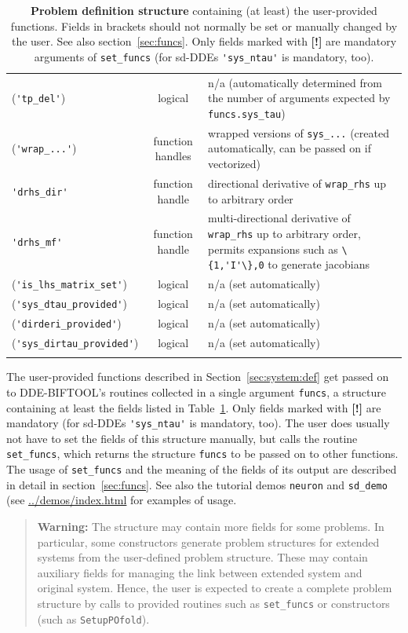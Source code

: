 \documentclass[10pt]{scrartcl}
\newcommand{\DDEBIFCODE}{\textsc{DDE-BIFTOOL}}
\newcommand{\demobase}{\url{../demos/index.html}}
\newcommand{\blist}[1]{\mbox{\lstinline!#1!}}
\begin{document}
\begin{table}[htbp]
\begin{tabular}[t]{l@{\hspace*{1ex}}c@{\hspace*{3ex}}p{}}
      (\blist{'tp_del'}) & logical & n/a (automatically
      determined from the number of arguments expected by \blist{funcs.sys_tau})\\[0.5ex]
      (\blist{'wrap_...'}) & function handles & wrapped versions of \blist{sys_...} (created automatically, can be passed on if vectorized)\\[0.5ex]
      \blist{'drhs_dir'} & function handle & directional derivative of \blist{wrap_rhs} up to arbitrary order\\[0.5ex]
      \blist{'drhs_mf'} & function handle & multi-directional derivative of \blist{wrap_rhs} up to arbitrary order, permits expansions such as \blist{\{1,'I'\},0} to generate jacobians\\[0.5ex]
      (\blist{'is_lhs_matrix_set'}) & logical & n/a (set automatically)\\[0.5ex]
      (\blist{'sys_dtau_provided'}) & logical & n/a (set automatically)\\[0.5ex]
      (\blist{'dirderi_provided'}) & logical & n/a (set automatically)\\[0.5ex]
      (\blist{'sys_dirtau_provided'}) & logical & n/a (set automatically)
      \\\noalign{\smallskip}\hline
  \end{tabular}
  \caption{\textbf{\textsf{Problem definition structure}} containing
    (at least) the user-provided functions.  Fields in brackets should
    not normally be set or manually changed by the user. See also
    section~\ref{sec:funcs}.  Only fields marked with \textbf{[!]} are
    mandatory arguments of \blist{set_funcs} (for sd-DDEs \blist{'sys_ntau'} is mandatory, too).}
  \label{tab:funcs}
\end{table}
The user-provided functions described in Section~\ref{sec:system:def}
get passed on to \DDEBIFCODE's routines collected in a single argument
\blist{funcs}, a structure containing at least the fields listed in
Table~\ref{tab:funcs}. Only fields marked with \textbf{[!]} are
mandatory (for sd-DDEs \blist{'sys_ntau'} is mandatory, too). The user
does usually not have to set the fields of this structure manually,
but calls the routine \blist{set_funcs}, which returns the structure
\blist{funcs} to be passed on to other functions. The usage of
\blist{set_funcs} and the meaning of the fields of its output are
described in detail in section~\ref{sec:funcs}. See also the tutorial
demos \texttt{neuron} and \texttt{sd\_demo} (see
\demobase{} for examples of usage.
\begin{quote}
  \textbf{Warning:} The structure may contain more fields for some
  problems. In particular, some constructors generate problem
  structures for extended systems from the user-defined problem
  structure. These may contain auxiliary fields for managing the link
  between extended system and original system. Hence, the user is
  expected to create a complete problem structure by calls to provided
  routines such as \blist{set_funcs} or constructors (such as
  \blist{SetupPOfold}).
\end{quote}
\end{document}
